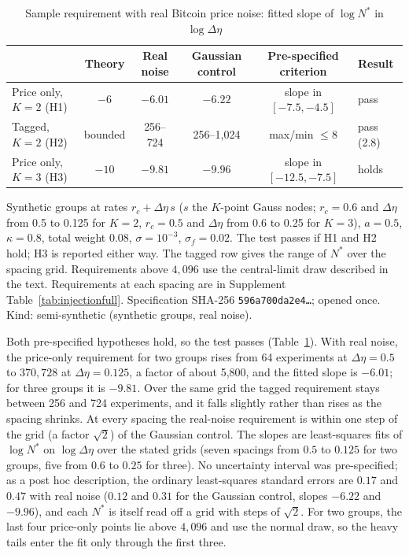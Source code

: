 \begin{table}[t]\centering\small
\begin{threeparttable}
\caption{Sample requirement with real Bitcoin price noise: fitted slope of $\log N^*$ in $\log\Delta\eta$}\label{tab:injection}
\begin{tabular}{lccccl}
\toprule
 & Theory & Real noise & Gaussian control & Pre-specified criterion & Result\\
\midrule
Price only, $K=2$ (H1) & $-6$ & $-6.01$ & $-6.22$ & slope in $[-7.5,-4.5]$ & pass\\
Tagged, $K=2$ (H2) & bounded & 256--724 & 256--1{,}024 & max/min $\le8$ & pass (2.8)\\
Price only, $K=3$ (H3) & $-10$ & $-9.81$ & $-9.96$ & slope in $[-12.5,-7.5]$ & holds\\
\bottomrule
\end{tabular}
\begin{tablenotes}\footnotesize\item Synthetic groups at rates $r_c+\Delta\eta\,s$ ($s$ the $K$-point Gauss nodes; $r_c=0.6$ and $\Delta\eta$ from 0.5 to 0.125 for $K=2$, $r_c=0.5$ and $\Delta\eta$ from 0.6 to 0.25 for $K=3$), $a=0.5$, $\kappa=0.8$, total weight 0.08, $\sigma=10^{-3}$, $\sigma_f=0.02$. The test passes if H1 and H2 hold; H3 is reported either way. The tagged row gives the range of $N^*$ over the spacing grid. Requirements above $4{,}096$ use the central-limit draw described in the text. Requirements at each spacing are in Supplement Table~\ref{tab:injectionfull}. Specification SHA-256 \texttt{596a700da2e4\ldots}; opened once. Kind: semi-synthetic (synthetic groups, real noise).\end{tablenotes}
\end{threeparttable}
\end{table}

Both pre-specified hypotheses hold, so the test passes (Table~\ref{tab:injection}). With real noise, the price-only requirement for two groups rises from 64 experiments at $\Delta\eta=0.5$ to $370{,}728$ at $\Delta\eta=0.125$, a factor of about 5{,}800, and the fitted slope is $-6.01$; for three groups it is $-9.81$. Over the same grid the tagged requirement stays between 256 and 724 experiments, and it falls slightly rather than rises as the spacing shrinks. At every spacing the real-noise requirement is within one step of the grid (a factor $\sqrt2$) of the Gaussian control. The slopes are least-squares fits of $\log N^*$ on $\log\Delta\eta$ over the stated grids (seven spacings from $0.5$ to $0.125$ for two groups, five from $0.6$ to $0.25$ for three). No uncertainty interval was pre-specified; as a post hoc description, the ordinary least-squares standard errors are $0.17$ and $0.47$ with real noise ($0.12$ and $0.31$ for the Gaussian control, slopes $-6.22$ and $-9.96$), and each $N^*$ is itself read off a grid with steps of $\sqrt2$. For two groups, the last four price-only points lie above $4{,}096$ and use the normal draw, so the heavy tails enter the fit only through the first three.

